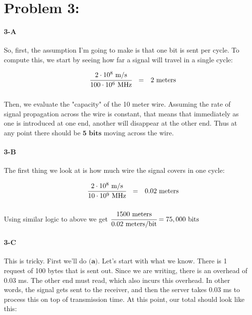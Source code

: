 \documentclass[a4paper]{article}
\begin{document}
\section*{Problem 3:}

\paragraph{3-A} So, first, the assumption I'm going to make is that one bit is sent per cycle. To compute this, we start by seeing how far a signal will travel in a single cycle:

\begin{equation}
\begin{array}{llrll}
& & \cfrac{2 \cdot 10^8 \mbox{ m/s}}{100 \cdot 10^6 \mbox{ MHz}} & = & 2 \mbox{ meters} \\[.15in]
\end{array}
\end{equation}

Then, we evaluate the "capacity" of the 10 meter wire. Assuming the rate of signal propagation across the wire is constant, that means that immediately as one is introduced at one end, another will disappear at the other end. Thus at any point there should be $\textbf{5 bits}$ moving across the wire.

\paragraph{3-B} The first thing we look at is how much wire the signal covers in one cycle:

\begin{equation}
\begin{array}{llrll}
& & \cfrac{2 \cdot 10^8 \mbox{ m/s}}{10 \cdot 10^9 \mbox{ MHz}} & = & 0.02 \mbox{ meters} \\[.15in]
\end{array}
\end{equation}

Using similar logic to above we get $\cfrac{1500 \mbox{ meters}}{0.02 \mbox{ meters/bit}} = 75,000 \mbox{ bits}$

\paragraph{3-C} This is tricky. First we'll do $\textbf{(a)}$. Let's start with what we know. There is 1 request of 100 bytes that is sent out. Since we are writing, there is an overhead of 0.03 ms. The other end must read, which also incurs this overhead. In other words, the signal gets sent to the receiver, and then the server takes 0.03 ms to process this on top of transmission time. At this point, our total should look like this:
\end{document}
